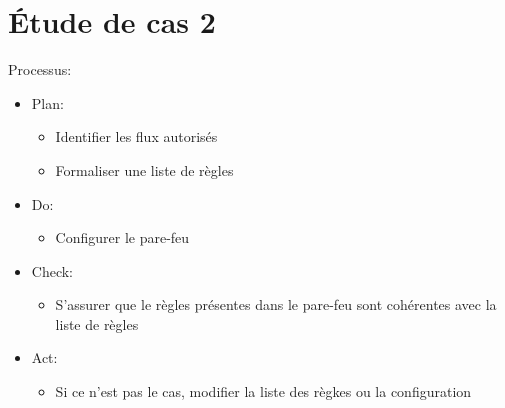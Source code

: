 \section{\'Etude de cas 2}
Processus:
\begin{itemize}
  \item Plan:
  \begin{itemize}
    \item Identifier les flux autoris\'es
    \item Formaliser une liste de r\`egles
  \end{itemize}
  \item Do:
  \begin{itemize}
    \item Configurer le pare-feu
  \end{itemize}
  \item Check:
  \begin{itemize}
    \item S'assurer que le r\`egles pr\'esentes dans le pare-feu sont coh\'erentes avec la liste de r\`egles
  \end{itemize}
  \item Act:
  \begin{itemize}
    \item Si ce n'est pas le cas, modifier la liste des r\`egkes ou la configuration
  \end{itemize}
\end{itemize}
